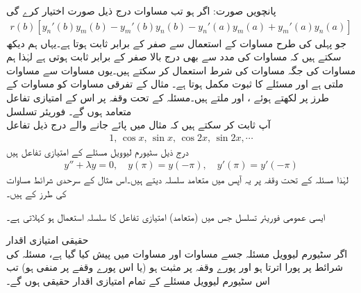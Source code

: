 پانچویں صورت: اگر  ہو تب مساوات   درج ذیل صورت اختیار کرے گی
\begin{align*}
r(b)[y_n'(b)y_m(b)-y_m'(b)y_n(b)-y_n'(a)y_m(a)+y_m'(a)y_n(a)]
\end{align*}
جو پہلی کی طرح  مساوات  کے استعمال سے صفر کے برابر ثابت ہوتا ہے۔یہاں ہم دیکھ سکتے ہیں کہ مساوات  کی مدد سے بھی درج بالا صفر کے برابر ثابت ہوتی ہے لہٰذا ہم مساوات  کی جگہ مساوات  کی شرط استعمال کر سکتے ہیں۔یوں مساوات  سے مساوات  ملتی ہے اور مسئلے کا ثبوت مکمل ہوتا ہے۔
مثال  کے تفرقی مساوات کو مساوات  کے طرز پر لکھتے ہوئے ،  اور  ملتے ہیں۔مسئلہ  کے تحت وقفہ  پر اس کے امتیازی تفاعل متعامد ہوں گے۔
\quad فوریئر تسلسل\\
آپ ثابت کر سکتے ہیں کہ مثال  میں پائے جانے والے درج ذیل تفاعل 
\begin{align*}
1,\, \cos x , \, \sin x,\, \cos 2x,\, \sin 2x, \cdots
\end{align*}
درج ذیل سٹیورم لیوویل مسئلے کے امتیازی تفاعل ہیں
\begin{align*}
y''+\lambda y=0, \quad y(\pi)=y(-\pi), \quad y'(\pi)=y'(-\pi)
\end{align*}
 لہٰذا مسئلہ  کے تحت وقفہ  پر  یہ آپس میں متعامد سلسلہ دیتے ہیں۔اس مثال کے سرحدی شرائط مساوات  کی طرز کے ہیں۔

ایسی عمومی فوریئر تسلسل جس میں (متعامد) امتیازی تفاعل کا سلسلہ استعمال ہو  کہلاتی ہے۔ 

\quad حقیقی امتیازی اقدار\\
اگر سٹیورم لیوویل مسئلہ  جسے مساوات  اور مساوات  میں پیش کیا گیا ہے، مسئلہ  کی شرائط پر پورا اترتا ہو اور پورے وقفہ  پر  مثبت ہو (یا اس پورے وقفے پر   منفی ہو) تب اس سٹیورم لیوویل مسئلے کے تمام امتیازی اقدار حقیقی ہوں گے۔

